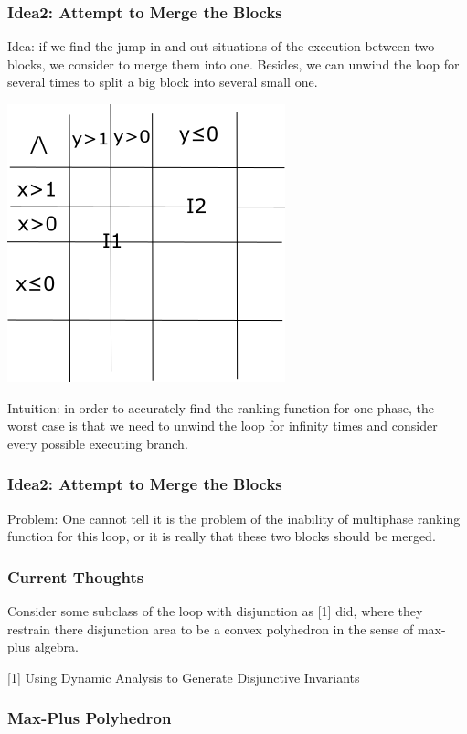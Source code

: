 \documentclass[11pt]{beamer}
\begin{document}
\begin{frame}\frametitle{Idea2: Attempt to Merge the Blocks}
Idea: if we find the jump-in-and-out situations of the execution between two blocks, we consider to merge them into one. Besides, we can unwind the loop for several times to split a big block into several small one.
\begin{center}

\includegraphics[scale = 0.45]{split.png}

\end{center}
Intuition: in order to accurately find the ranking function for one phase, the worst case is that we need to unwind the loop for infinity times and consider every possible executing branch.
\end{frame}

\begin{frame}\frametitle{Idea2: Attempt to Merge the Blocks}

Problem: One cannot tell it is the problem of the inability of multiphase ranking function for this loop, or it is really that these two blocks should be merged.

\end{frame}

\begin{frame}\frametitle{Current Thoughts}
Consider some subclass of the loop with disjunction as [1] did, where they restrain there disjunction area to be a convex polyhedron in the sense of max-plus algebra.

[1] Using Dynamic Analysis to Generate Disjunctive Invariants
\end{frame}

\begin{frame}\frametitle{Max-Plus Polyhedron}


\end{frame}
\end{document}
